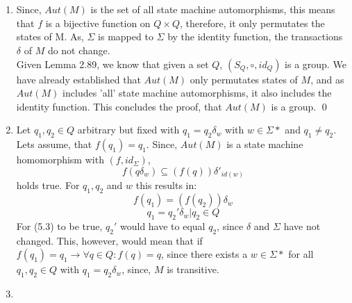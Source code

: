 \documentclass[a4paper,12pt,numbers=noenddot]{scrreport}
\begin{document}
\section{}
\begin{enumerate}
    \item Since, $Aut(M)$ is the set of all state machine automorphisms, this means that $f$ is a bijective function on $Q \times Q$, therefore, it only permutates the states of M. As, $\Sigma$ is  mapped to $\Sigma$ by the identity function, the transactions $\delta$ of $M$ do not change.\\
    Given Lemma 2.89, we know that given a set $Q$, $(S_Q, \circ, id_Q)$ is a group. We have already established that $Aut(M)$ only permutates states of $M$, and as $Aut(M)$ includes 'all' state machine automorphisms, it also includes the identity function.
    This concludes the proof, that $Aut(M)$ is a group.
    \qed
    \item Let $q_1, q_2 \in Q$ arbitrary but fixed with $q_1 = q_2\delta_w$ with $w \in \Sigma*$ and $q_1 \neq q_2$. Lets assume, that $f(q_1) = q_1$. Since, $Aut(M)$ is a state machine homomorphism with $(f, id_\Sigma)$, 
    \begin{equation}
        f(q\delta_w) \subseteq (f(q))\delta'_{id(w)}
    \end{equation}
    holds true. For $q_1, q_2$ and $w$ this results in:
    \begin{equation}
        f(q_1) = (f(q_2))\delta_w
    \end{equation}
    \begin{equation}
        q_1 = q_2'\delta_w | q_2 \in Q
    \end{equation}
    For (5.3) to be true, $q_2'$ would have to equal $q_2$, since $\delta$ and $\Sigma$ have not changed. This, however, would mean that if $f(q_1) = q_1 \rightarrow \forall q \in Q: f(q) = q$, since there exists a $w \in \Sigma*$ for all $q_1, q_2 \in Q$ with $q_1 = q_2\delta_w$, since, $M$ is transitive.
    \item 
\end{enumerate}

\section{}
\end{document}
